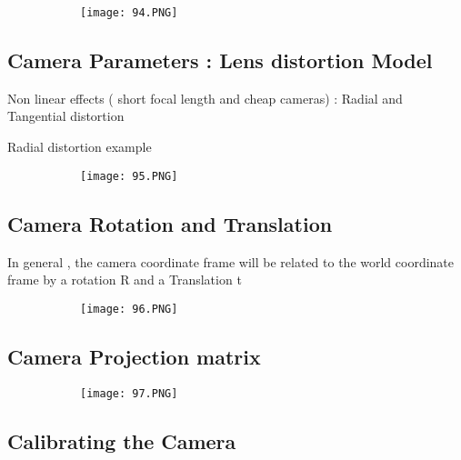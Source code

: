 \documentclass{article}
\begin{document}
\begin{figure}[ht!]
  \centering
  \begin{subfigure}[b]{0.4\linewidth}
    \texttt{[image: 94.PNG]}
  \end{subfigure}
\end{figure}

\subsection{Camera Parameters : Lens distortion Model}

Non linear effects ( short focal length and cheap cameras) : Radial and Tangential distortion

Radial distortion example

\begin{figure}[ht!]
  \centering
  \begin{subfigure}[b]{0.4\linewidth}
    \texttt{[image: 95.PNG]}
  \end{subfigure}
\end{figure}

\subsection{Camera Rotation and Translation}

In general , the camera coordinate frame will be related to the world coordinate frame by a rotation R and a Translation t

\begin{figure}[ht!]
  \centering
  \begin{subfigure}[b]{0.4\linewidth}
    \texttt{[image: 96.PNG]}
  \end{subfigure}
\end{figure}


\subsection{Camera Projection matrix}

\begin{figure}[ht!]
  \centering
  \begin{subfigure}[b]{0.4\linewidth}
    \texttt{[image: 97.PNG]}
  \end{subfigure}
\end{figure}

\subsection{Calibrating the Camera}
\end{document}
